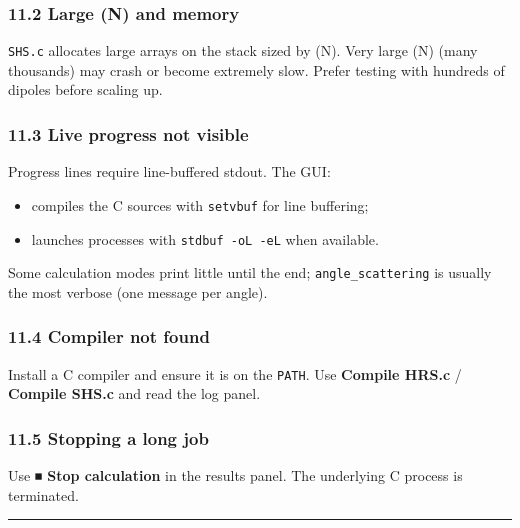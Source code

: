 \hypertarget{large-n-and-memory}{%
\subsubsection{11.2 Large (N) and memory}\label{large-n-and-memory}}

\texttt{SHS.c} allocates large arrays on the stack sized by (N). Very
large (N) (many thousands) may crash or become extremely slow. Prefer
testing with hundreds of dipoles before scaling up.

\hypertarget{live-progress-not-visible}{%
\subsubsection{11.3 Live progress not
visible}\label{live-progress-not-visible}}

Progress lines require line-buffered stdout. The GUI:

\begin{itemize}
\tightlist
\item
  compiles the C sources with \texttt{setvbuf} for line buffering;\\
\item
  launches processes with \texttt{stdbuf\ -oL\ -eL} when available.
\end{itemize}

Some calculation modes print little until the end;
\texttt{angle\_scattering} is usually the most verbose (one message per
angle).

\hypertarget{compiler-not-found}{%
\subsubsection{11.4 Compiler not found}\label{compiler-not-found}}

Install a C compiler and ensure it is on the \texttt{PATH}. Use
\textbf{Compile HRS.c} / \textbf{Compile SHS.c} and read the log panel.

\hypertarget{stopping-a-long-job}{%
\subsubsection{11.5 Stopping a long job}\label{stopping-a-long-job}}

Use \textbf{⏹ Stop calculation} in the results panel. The underlying C
process is terminated.

\begin{center}\rule{0.5\linewidth}{0.5pt}\end{center}

